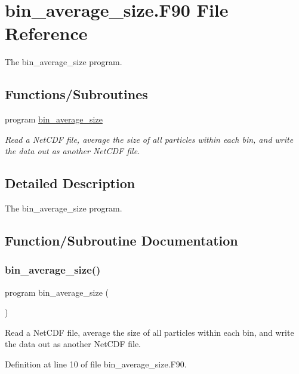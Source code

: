 \hypertarget{bin__average__size_8_f90}{}\section{bin\+\_\+average\+\_\+size.\+F90 File Reference}
\label{bin__average__size_8_f90}


The bin\+\_\+average\+\_\+size program.  


\subsection*{Functions/\+Subroutines}
\begin{DoxyCompactItemize}
\item 
program \mbox{\hyperlink{bin__average__size_8_f90_ac6a69ef9e1ebca40d3f982a9526e985f}{bin\+\_\+average\+\_\+size}}
\begin{DoxyCompactList}\small\item\em Read a Net\+C\+DF file, average the size of all particles within each bin, and write the data out as another Net\+C\+DF file. \end{DoxyCompactList}\end{DoxyCompactItemize}


\subsection{Detailed Description}
The bin\+\_\+average\+\_\+size program. 



\subsection{Function/\+Subroutine Documentation}
\mbox{\label{bin__average__size_8_f90_ac6a69ef9e1ebca40d3f982a9526e985f}} 
\subsubsection{\texorpdfstring{bin\+\_\+average\+\_\+size()}{bin\_average\_size()}}
{\footnotesize\ttfamily program bin\+\_\+average\+\_\+size (\begin{DoxyParamCaption}{ }\end{DoxyParamCaption})}



Read a Net\+C\+DF file, average the size of all particles within each bin, and write the data out as another Net\+C\+DF file. 



Definition at line 10 of file bin\+\_\+average\+\_\+size.\+F90.

